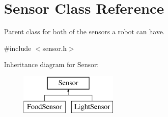 \hypertarget{class_sensor}{}\section{Sensor Class Reference}
\label{class_sensor}


Parent class for both of the sensors a robot can have.  




{\ttfamily \#include $<$sensor.\+h$>$}

Inheritance diagram for Sensor\+:\begin{figure}[H]
\begin{center}
\leavevmode
\includegraphics[height=2.000000cm]{class_sensor}
\end{center}
\end{figure}
